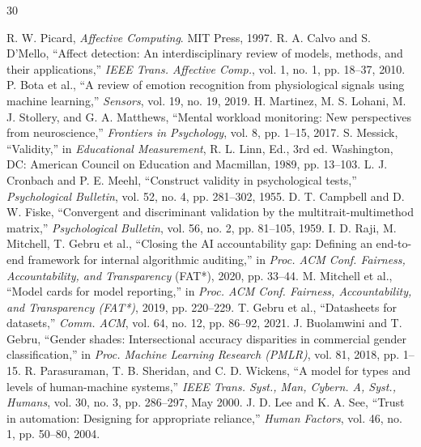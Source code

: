\documentclass[journal]{IEEEtran}
\begin{document}

\begin{thebibliography}{30}
\footnotesize
\setlength{\itemsep}{0pt}
\setlength{\parskip}{0pt}

 R. W. Picard, \emph{Affective Computing}. MIT Press, 1997.
 R. A. Calvo and S. D'Mello, ``Affect detection: An interdisciplinary review of models, methods, and their applications,'' \emph{IEEE Trans. Affective Comp.}, vol. 1, no. 1, pp. 18--37, 2010.
 P. Bota et al., ``A review of emotion recognition from physiological signals using machine learning,'' \emph{Sensors}, vol. 19, no. 19, 2019.
 H. Martinez, M. S. Lohani, M. J. Stollery, and G. A. Matthews, ``Mental workload monitoring: New perspectives from neuroscience,'' \emph{Frontiers in Psychology}, vol. 8, pp. 1--15, 2017.
 S. Messick, ``Validity,'' in \emph{Educational Measurement}, R. L. Linn, Ed., 3rd ed. Washington, DC: American Council on Education and Macmillan, 1989, pp. 13--103.
 L. J. Cronbach and P. E. Meehl, ``Construct validity in psychological tests,'' \emph{Psychological Bulletin}, vol. 52, no. 4, pp. 281--302, 1955.
 D. T. Campbell and D. W. Fiske, ``Convergent and discriminant validation by the multitrait-multimethod matrix,'' \emph{Psychological Bulletin}, vol. 56, no. 2, pp. 81--105, 1959.
 I. D. Raji, M. Mitchell, T. Gebru et al., ``Closing the AI accountability gap: Defining an end-to-end framework for internal algorithmic auditing,'' in \emph{Proc. ACM Conf. Fairness, Accountability, and Transparency} \mbox{(FAT*),} 2020, pp. 33--44.
 M. Mitchell et al., ``Model cards for model reporting,'' in \emph{Proc. ACM Conf. Fairness, Accountability, and Transparency (FAT*)}, 2019, pp. 220--229.
 T. Gebru et al., ``Datasheets for datasets,'' \emph{Comm. ACM}, vol. 64, no. 12, pp. 86--92, 2021.
 J. Buolamwini and T. Gebru, ``Gender shades: Intersectional accuracy disparities in commercial gender classification,'' in \emph{Proc. Machine Learning Research (PMLR)}, vol. 81, 2018, pp. 1--15.
 R. Parasuraman, T. B. Sheridan, and C. D. Wickens, ``A model for types and levels of human-machine systems,'' \emph{IEEE Trans. Syst., Man, Cybern. A, Syst., Humans}, vol. 30, no. 3, pp. 286--297, May 2000.
 J. D. Lee and K. A. See, ``Trust in automation: Designing for appropriate reliance,'' \emph{Human Factors}, vol. 46, no. 1, pp. 50--80, 2004.

\end{thebibliography}
\end{document}
